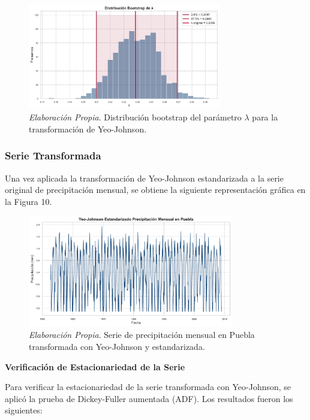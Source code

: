 \documentclass[12pt,letterpaper]{article}   %
\begin{document}
\begin{figure}[h!]
    \centering
    \includegraphics[width=0.75\textwidth]{imagenes/03-06-lambda-yj-bootstrapping.pdf}
    \caption{\textit{Elaboración Propia}. Distribución bootstrap del parámetro $\lambda$ para la transformación de Yeo-Johnson.}
\end{figure}


\subsubsection{Serie Transformada}
Una vez aplicada la transformación de Yeo-Johnson estandarizada a la serie original de precipitación mensual, se obtiene la siguiente representación gráfica en la Figura 10.

\begin{figure}[h!]
    \centering
    \includegraphics[width=0.8\textwidth]{imagenes/03-07-precipitacion_yeo_johnson.pdf}
    \caption{\textit{Elaboración Propia}. Serie de precipitación mensual en Puebla transformada con Yeo-Johnson y estandarizada.}
    \label{fig:yeojohnson_series}
\end{figure}



\textbf{Verificación de Estacionariedad de la Serie}

Para verificar la estacionariedad de la serie transformada con Yeo-Johnson, se aplicó la prueba de Dickey-Fuller aumentada (ADF). Los resultados fueron los siguientes:
\end{document}
